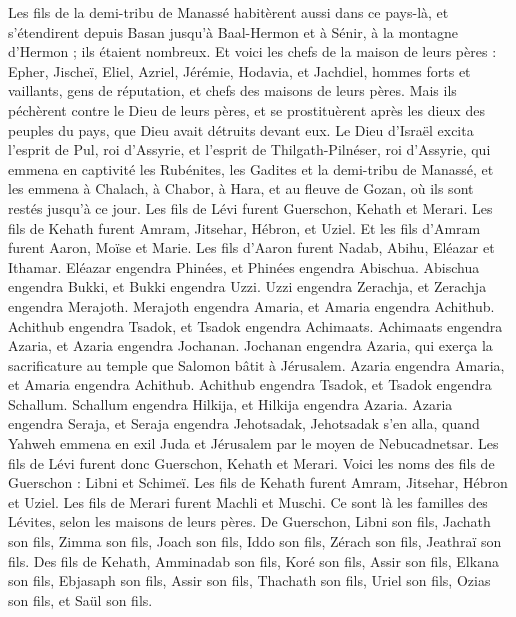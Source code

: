 \begin{multicols}{2}
Les fils de la demi-tribu de Manassé habitèrent aussi dans ce pays-là, et s'étendirent depuis Basan jusqu'à Baal-Hermon et à Sénir, à la montagne d’Hermon ; ils étaient nombreux.
Et voici les chefs de la maison de leurs pères : Epher, Jischeï, Eliel, Azriel, Jérémie, Hodavia, et Jachdiel, hommes forts et vaillants, gens de réputation, et chefs des maisons de leurs pères.
Mais ils péchèrent contre le Dieu de leurs pères, et se prostituèrent après les dieux des peuples du pays, que Dieu avait détruits devant eux.
Le Dieu d'Israël excita l'esprit de Pul, roi d’Assyrie, et l'esprit de Thilgath-Pilnéser, roi d’Assyrie,  qui emmena en captivité les Rubénites, les Gadites et la demi-tribu de Manassé, et les emmena à Chalach, à Chabor, à Hara, et au fleuve de Gozan, où ils sont restés jusqu'à ce jour.
\VerseOne{}Les fils de Lévi furent Guerschon, Kehath et Merari.
Les fils de Kehath furent  Amram, Jitsehar, Hébron, et Uziel.
Et les fils d'Amram furent Aaron, Moïse et Marie. Les fils d'Aaron furent  Nadab, Abihu, Eléazar et Ithamar.
Eléazar engendra Phinées, et Phinées engendra Abischua.
Abischua engendra Bukki, et Bukki engendra Uzzi.
Uzzi engendra Zerachja, et Zerachja engendra Merajoth.
Merajoth engendra Amaria, et Amaria engendra Achithub.
Achithub engendra Tsadok, et Tsadok engendra Achimaats.
Achimaats engendra Azaria, et Azaria engendra Jochanan.
Jochanan engendra Azaria, qui exerça la sacrificature au temple que Salomon bâtit à Jérusalem.
Azaria engendra Amaria, et Amaria engendra Achithub.
Achithub engendra Tsadok, et Tsadok engendra Schallum.
Schallum engendra Hilkija, et Hilkija engendra Azaria.
Azaria engendra Seraja, et Seraja engendra Jehotsadak,
Jehotsadak s'en alla, quand Yahweh emmena en exil Juda et Jérusalem par le moyen de Nebucadnetsar.
Les fils de Lévi  furent donc  Guerschon, Kehath et Merari.
Voici les noms des fils de Guerschon : Libni et Schimeï.
Les fils de Kehath furent Amram, Jitsehar, Hébron et Uziel.
Les fils de Merari furent  Machli et Muschi. Ce sont là les familles des Lévites, selon les maisons de leurs pères.
De Guerschon, Libni son fils, Jachath son fils, Zimma son fils,
Joach son fils, Iddo son fils, Zérach son fils, Jeathraï son fils.
Des fils de Kehath, Amminadab son fils, Koré son fils, Assir son fils,
Elkana son fils, Ebjasaph son fils, Assir son fils,
Thachath son fils, Uriel son fils, Ozias son fils, et Saül son fils.

\end{multicols}
